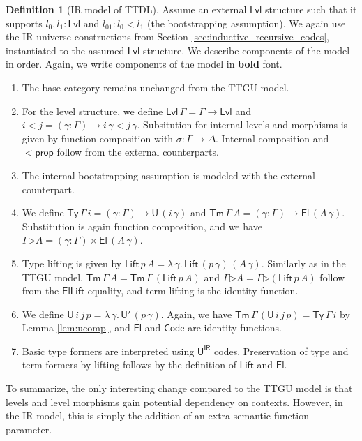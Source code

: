 \documentclass[a4paper,UKenglish,cleveref, autoref, thm-restate]{lipics-v2021}
\theoremstyle{remark}
\theoremstyle{definition}
\newtheorem{mydefinition}{Definition}
\newcommand{\Ty}{\mathsf{Ty}}
\newcommand{\Tm}{\mathsf{Tm}}
\newcommand{\U}{\mathsf{U}}
\newcommand{\El}{\mathsf{El}}
\newcommand{\ext}{\triangleright}
\newcommand{\Lift}{\mathsf{Lift}}
\newcommand{\Lvl}{\mathsf{Lvl}}
\renewcommand{\U}{\mathsf{U}}
\newcommand{\Code}{\mathsf{Code}}
\newcommand{\msf}[1]{\mathsf{#1}}
\newcommand{\uir}{\msf{U^{IR}}}
\begin{document}
\begin{mydefinition}[IR model of TTDL]\label{def:ttdlmodel}
 Assume an external $\Lvl$ structure such that it supports $l_0, l_1 : \Lvl$ and
 $l_{01} : l_0 < l_1$ (the bootstrapping assumption). We again use the IR
 universe constructions from Section \ref{sec:inductive_recursive_codes},
 instantiated to the assumed $\Lvl$ structure. We describe components of the
 model in order. Again, we write components of the model in \textbf{bold} font.
\begin{enumerate}
\item The base category remains unchanged from the TTGU model.
\item For the level structure, we define $\bm{\Lvl}\,\Gamma = \Gamma \to \Lvl$ and
  $i \bm{<} j = (\gamma : \Gamma) \to i\,\gamma < j\,\gamma$. Subsitution for internal
  levels and morphisms is given by function composition with $\sigma : \Gamma \to \Delta$.
  Internal composition and $\bm{<\!\msf{prop}}$ follow from the external counterparts.
\item The internal bootstrapping assumption is modeled with the external counterpart.
\item We define $\bm{\Ty}\,\Gamma\,i = (\gamma : \Gamma) \to \U\,(i\,\gamma)$ and
  $\bm{\Tm}\,\Gamma\,A = (\gamma : \Gamma) \to \El\,(A\,\gamma)$. Substitution is
  again function composition, and we have $\Gamma \bm{\ext} A = (\gamma :
  \Gamma)\times \El\,(A\,\gamma)$.
\item Type lifting is given by $\bm{\Lift}\,p\,A = \lambda\,\gamma.\,
  \Lift\,(p\,\gamma)\,(A\,\gamma)$.  Similarly as in the TTGU model,
  $\bm{\Tm}\,\Gamma\,A = \bm{\Tm}\,\Gamma\,(\bm{\Lift}\,p\,A)$ and $\Gamma \bm{\ext}
  A = \Gamma \bm{\ext} (\bm{\Lift}\,p\,A)$ follow from the $\msf{ElLift}$
  equality, and term lifting is the identity function.
\item We define $\bm{\U}\,i\,j\,p = \lambda\,\gamma.\,\U'\,(p\,\gamma)$. Again,
  we have $\bm{\Tm}\,\Gamma\,(\U\,i\,j\,p) = \bm{\Ty}\,\Gamma\,i$ by Lemma \ref{lem:ucomp},
  and $\bm{\El}$ and $\bm{\Code}$ are identity functions.
\item Basic type formers are interpreted using $\uir$ codes. Preservation of
  type and term formers by lifting follows by the definition of $\Lift$ and
  $\El$.
\end{enumerate}
\end{mydefinition}

To summarize, the only interesting change compared to the TTGU model is that
levels and level morphisms gain potential dependency on contexts. However, in the
IR model, this is simply the addition of an extra semantic function parameter.
\end{document}
